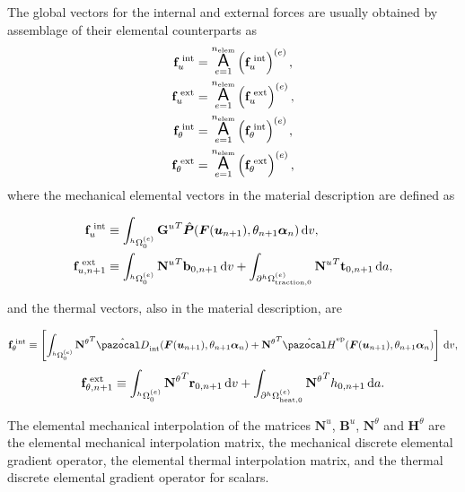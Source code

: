 \pagebreak

The global vectors for the internal and external forces are usually obtained by assemblage of their elemental counterparts as
\begin{gather}
    \mathbf f_u^\text{\;int} = \operatorname*{\text{\Large $ \mathsf{A} $}}_{e=1}^{n_\text{elem}} \left(\mathbf f_u^\text{\;int}\right)^{(e)},\\
    \mathbf f_u^\text{\;ext} = \operatorname*{\text{\Large $ \mathsf{A} $}}_{e=1}^{n_\text{elem}} \left(\mathbf f_u^\text{\;ext}\right)^{(e)},\\
    \mathbf f_\theta^\text{\;int} = \operatorname*{\text{\Large $ \mathsf{A} $}}_{e=1}^{n_\text{elem}} \left(\mathbf f_\theta^\text{\;int}\right)^{(e)},\\
    \mathbf f_\theta^\text{\;ext} = \operatorname*{\text{\Large $ \mathsf{A} $}}_{e=1}^{n_\text{elem}} \left(\mathbf f_\theta^\text{\;ext}\right)^{(e)},
\end{gather}
where the mechanical elemental vectors in the material description are defined as
\begin{highlight}[innertopmargin=-5pt]
    \begin{align}
        \mathbf f_u^\text{\;int} &\equiv \int_{^h\Omega_0^{(e)}}{\mathbf G^{u}}^T \hat{\bm{P}}(\bm{F}(\bm u_{n+1}), \theta_{n+1} \bm \alpha_n)\,\mathrm{d} v,\\
        \mathbf f^\text{\;ext}_{u,n+1} &\equiv \int_{^h\Omega_0^{(e)}}{\mathbf N^{u}}^T \mathbf b_{0,n+1}\,\mathrm{d} v + \int_{\partial^h\Omega_\text{traction,0}^{(e)}}{\mathbf N^{u}}^T \mathbf t_{0,n+1}\,\mathrm{d} a,
    \end{align}
\end{highlight}
and the thermal vectors, also in the material description, are
\begin{highlight}[innertopmargin=-5pt]
\begin{multline}
    \mathbf f_\theta^\text{\;int} \equiv \left[\int_{^h\Omega_0^{(e)}}{\mathbf N^{\theta}}^T \hat{\pazocal D}_\text{int}(\mat F(\bm u_{n+1}), \theta_{n+1} \bm \alpha_n) +{\mathbf N^{\theta}}^T\hat{\pazocal H}^\text{ep}(\mat F(\bm u_{n+1}), \theta_{n+1} \bm \alpha_n)\right] \ud v,
\end{multline}
\begin{equation}
    \mathbf f^\text{\;ext}_{\theta,n+1} \equiv \int_{^h\Omega_0^{(e)}}{\mathbf N^{\theta}}^T \mathbf r_{0,n+1}\,\mathrm{d} v + \int_{\partial^h\Omega_\text{heat,0}^{(e)}}{\mathbf N^{\theta}}^T h_{0,n+1}\,\mathrm{d} a.
\end{equation}
\end{highlight}
The elemental mechanical interpolation of the matrices $\mathbf N^u$, $\mathbf B^u$, \(\mathbf N^\theta\) and $\mathbf H^\theta$ are the elemental mechanical interpolation matrix, the mechanical discrete elemental gradient operator, the elemental thermal interpolation matrix, and the thermal discrete elemental gradient operator for scalars.

